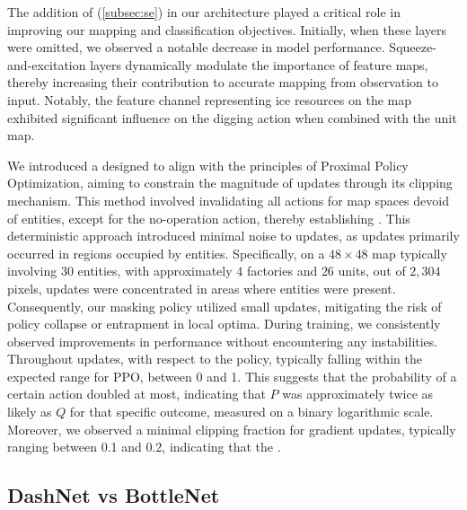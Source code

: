 \bigskip

\noindent The addition of  (\autoref{subsec:se}) in our architecture played a critical role in improving our mapping and classification objectives. Initially, when these layers were omitted, we observed a notable decrease in model performance. Squeeze-and-excitation layers dynamically modulate the importance of feature maps, thereby increasing their contribution to accurate mapping from observation to input. Notably, the feature channel representing ice resources on the map exhibited significant influence on the digging action when combined with the unit map.

\bigskip

\noindent We introduced a  designed to align with the principles of Proximal Policy Optimization, aiming to constrain the magnitude of updates through its clipping mechanism. This method involved invalidating all actions for map spaces devoid of entities, except for the no-operation action, thereby establishing . This deterministic approach introduced minimal noise to updates, as updates primarily occurred in regions occupied by entities. Specifically, on a $48\times48$ map typically involving $30$ entities, with approximately $4$ factories and $26$ units, out of $2,304$ pixels, updates were concentrated in areas where entities were present. Consequently, our masking policy utilized small updates, mitigating the risk of policy collapse or entrapment in local optima. During training, we consistently observed improvements in performance without encountering any instabilities. Throughout updates,  with respect to the policy, typically falling within the expected range for PPO, between 0 and 1. This suggests that the probability of a certain action doubled at most, indicating that $P$ was approximately twice as likely as $Q$ for that specific outcome, measured on a binary logarithmic scale. Moreover, we observed a minimal clipping fraction for gradient updates, typically ranging between 0.1 and 0.2, indicating that the .

\subsection{DashNet vs BottleNet}

